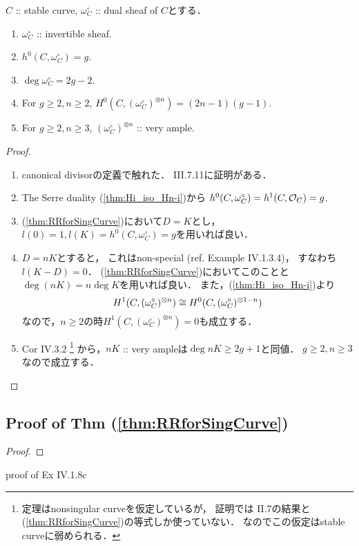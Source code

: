 \documentclass[a4paper]{jsarticle}
\newcommand{\dualsh}{\omega^{\circ}}
\begin{document}
    \begin{Prop}
        $C$ :: stable curve, $\dualsh_C$ :: dual sheaf of $C$とする．
        \begin{enumerate}[label=(\roman*), leftmargin=*]
            \item $\dualsh_C$ :: invertible sheaf.
            \item $h^0(C, \dualsh_C)=g$.
            \item $\deg \dualsh_C=2g-2$.
            \item For $g \geq 2, n \geq 2$, $H^0(C, (\dualsh_C)^{\otimes n})=(2n-1)(g-1)$.
            \item For $g \geq 2, n \geq 3$, $(\dualsh_C)^{\otimes n}$ :: very ample.
        \end{enumerate}
    \end{Prop}
    \begin{proof}
        \begin{enumerate}[label=(\roman*), leftmargin=*]
        \item
        canonical divisorの定義で触れた．
        \cite{HarAG} III.7.11に証明がある．

        \item
        The Serre duality (\ref{thm:Hi_iso_Hn-i})から
        $h^0(C, \dualsh_C)=h^1(C, \shO_C)=g$.

        \item
        (\ref{thm:RRforSingCurve})において$D=K$とし，
        $l(0)=1, l(K)=h^0(C, \dualsh_C)=g$を用いれば良い．

        \item
        $D=nK$とすると，
        これはnon-special (ref. \cite{HarAG} Example IV.1.3.4)，
        すなわち$l(K-D)=0$．
        (\ref{thm:RRforSingCurve})においてこのことと$\deg (nK)=n \deg K$を用いれば良い．
        また，(\ref{thm:Hi_iso_Hn-i})より
        \[ H^1(C, (\dualsh_C)^{\otimes n}) \iso H^0(C, (\dualsh_C)^{\otimes 1-n}) \]
        なので，$n \geq 2$の時$H^1(C, (\dualsh_C)^{\otimes n})=0$も成立する．

        \item
        \cite{HarAG} Cor IV.3.2
        \footnote
        {
            定理はnonsingular curveを仮定しているが，
            証明では\cite{HarAG} II.7の結果と(\ref{thm:RRforSingCurve})の等式しか使っていない．
            なのでこの仮定はstable curveに弱められる．
        }
        から，$nK$ :: very ampleは$\deg nK \geq 2g+1$と同値．
        $g \geq 2, n \geq 3$なので成立する．
        \end{enumerate}
    \end{proof}

    \subsection{Proof of Thm (\ref{thm:RRforSingCurve})}
    \begin{proof}
    \end{proof}

    proof of \cite{HarAG} Ex IV.1.8c



\end{document}
